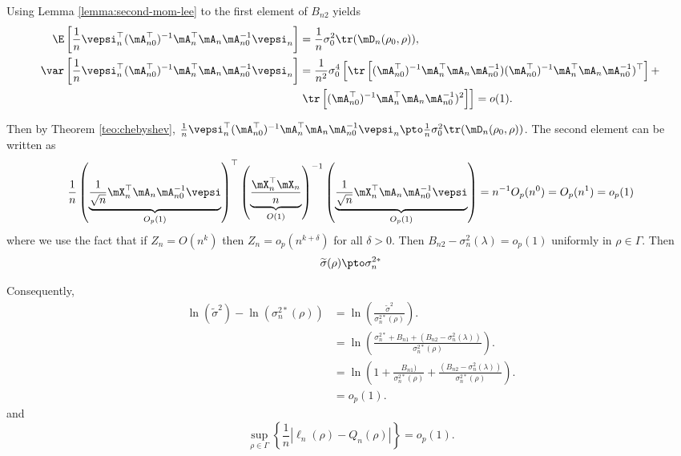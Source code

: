 \documentclass[english,12pt]{book}\usepackage[]{graphicx}\usepackage[]{xcolor}
\begin{document}
\begin{subappendices}
Using Lemma \ref{lemma:second-mom-lee} to the first element of $B_{n2}$ yields
\begin{equation*}
\begin{aligned}
\E\left[\frac{1}{n}\vepsi_n^\top(\mA_{n0}^\top)^{-1}\mA_n^\top\mA_n\mA_{n0}^{-1}\vepsi_n\right] &  = \frac{1}{n}\sigma_0^2\tr(\mD_{n}(\rho_0, \rho)), \\
\var\left[\frac{1}{n}\vepsi_n^\top(\mA_{n0}^\top)^{-1}\mA_n^\top\mA_n\mA_{n0}^{-1}\vepsi_n\right]& = \frac{1}{n^2}\sigma_0^4\left[\tr\left[(\mA_{n0}^\top)^{-1}\mA_n^\top\mA_n\mA_{n0}^{-1})(\mA_{n0}^\top)^{-1}\mA_n^\top\mA_n\mA_{n0}^{-1})^\top\right] +  \right. \\
& \left. \tr\left[(\mA_{n0}^\top)^{-1}\mA_n^\top\mA_n\mA_{n0}^{-1})^2\right]\right] = o(1).
\end{aligned}
\end{equation*}

Then by Theorem \ref{teo:chebyshev}, $\frac{1}{n}\vepsi_n^\top(\mA_{n0}^\top)^{-1}\mA_n^\top\mA_n\mA_{n0}^{-1}\vepsi_n\pto \frac{1}{n}\sigma_0^2\tr(\mD_{n}(\rho_0, \rho))$. The second element can be written as
\begin{equation*}
\frac{1}{n}\left(\underbrace{\frac{1}{\sqrt{n}}\mX_n^\top\mA_n\mA_{n0}^{-1}\vepsi}_{O_p(1)}\right)^\top\left(\underbrace{\frac{\mX_n^\top\mX_n}{n}}_{O(1)}\right)^{-1}\left(\underbrace{\frac{1}{\sqrt{n}}\mX_n^\top\mA_n\mA_{n0}^{-1}\vepsi}_{O_p(1)}\right) = n^{-1}O_p(n^0) = O_p(n^{1})= o_p(1)
\end{equation*}
%
where we use the fact that if $Z_n = O(n^k)$ then $Z_n = o_p(n^{k + \delta})$ for all $\delta>0$. Then $B_{n2}  - \sigma^2_n(\lambda) = o_p(1)$ uniformly in $\rho \in \Gamma$. Then 
\begin{equation*}
\widetilde{\sigma}(\rho)  \pto \sigma^{2*}_n
\end{equation*}

Consequently, 
\begin{equation*}
\begin{aligned}
\ln( \widetilde{\sigma}^{2}) - \ln(\sigma^{2*}_n(\rho)) & = \ln\left(\frac{\widetilde{\sigma}^{2}}{\sigma^{2*}_n(\rho)}\right). \\
& = \ln\left(\frac{\sigma^{2*}_n + B_{n1} + (B_{n2} - \sigma^2_n(\lambda)) }{\sigma^{2*}_n(\rho)}\right). \\
& = \ln\left(1 + \frac{B_{n1}) }{\sigma^{2*}_n(\rho)} + \frac{(B_{n2} - \sigma^2_n(\lambda)) }{\sigma^{2*}_n(\rho)}\right) .\\
& = o_p(1).
\end{aligned}
\end{equation*}
%
and
\begin{equation*}
\sup_{\rho\in \Gamma} \left\lbrace \frac{1}{n}\left|  \ell_n(\rho) - Q_n(\rho)\right|\right\rbrace = o_p(1).
\end{equation*}


\end{subappendices}
\end{document}
